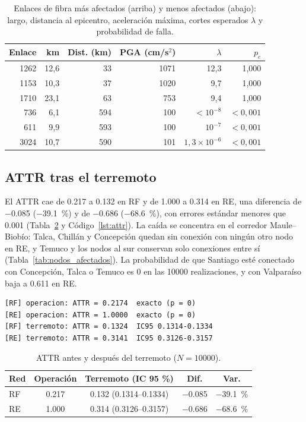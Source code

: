 \documentclass[conference]{IEEEtran}
\begin{document}
\begin{table}[t]
\centering
\caption{Enlaces de fibra más afectados (arriba) y menos afectados (abajo): largo, distancia al epicentro, aceleración máxima, cortes esperados $\lambda$ y probabilidad de falla.}
\label{tab:enlaces}
\footnotesize
\begin{tabular}{@{}rrrrrr@{}}
\toprule
Enlace & km & Dist. (km) & PGA (cm/s$^2$) & $\lambda$ & $p_e$ \\
\midrule
1262 & 12,6 & 33 & \num{1071} & 12,3 & 1,000 \\
1153 & 10,3 & 37 & \num{1020} & 9,7 & 1,000 \\
1710 & 23,1 & 63 & 753 & 9,4 & 1,000 \\
\midrule
736 & 6,1 & 594 & 100 & $<10^{-8}$ & $<0{,}001$ \\
611 & 9,9 & 593 & 100 & $10^{-7}$ & $<0{,}001$ \\
3024 & 10,7 & 590 & 101 & $1{,}3\times10^{-6}$ & $<0{,}001$ \\
\bottomrule
\end{tabular}
\end{table}

\subsection{ATTR tras el terremoto}
El ATTR cae de \num{0,217} a \num{0,132} en RF y de \num{1,000} a \num{0,314} en RE, una diferencia de \num{-0,085} (\SI{-39,1}{\percent}) y de \num{-0,686} (\SI{-68,6}{\percent}), con errores estándar menores que \num{0,001} (Tabla~\ref{tab:attr} y Código~\ref{lst:attr}).
La caída se concentra en el corredor Maule--Biobío: Talca, Chillán y Concepción quedan sin conexión con ningún otro nodo en RE, y Temuco y los nodos al sur conservan solo conexiones entre sí (Tabla~\ref{tab:nodos_afectados}).
La probabilidad de que Santiago esté conectado con Concepción, Talca o Temuco es 0 en las \num{10000} realizaciones, y con Valparaíso baja a \num{0,611} en RE.

\begin{lstlisting}[caption={Extracto de la salida de \texttt{src/attr.py}; el terremoto usa Monte Carlo con $N=10000$ y semilla 20100227.},label={lst:attr}]
[RF] operacion: ATTR = 0.2174  exacto (p = 0)
[RE] operacion: ATTR = 1.0000  exacto (p = 0)
[RF] terremoto: ATTR = 0.1324  IC95 0.1314-0.1334
[RE] terremoto: ATTR = 0.3141  IC95 0.3126-0.3157
\end{lstlisting}

\begin{table}[t]
\centering
\caption{ATTR antes y después del terremoto ($N=\num{10000}$).}
\label{tab:attr}
\footnotesize
\begin{tabular}{@{}lcccc@{}}
\toprule
Red & Operación & Terremoto (IC 95 \%) & Dif. & Var. \\
\midrule
RF & \num{0,217} & \num{0,132} (\num{0,1314}--\num{0,1334}) & \num{-0,085} & \SI{-39,1}{\percent} \\
RE & \num{1,000} & \num{0,314} (\num{0,3126}--\num{0,3157}) & \num{-0,686} & \SI{-68,6}{\percent} \\
\bottomrule
\end{tabular}
\end{table}
\end{document}

